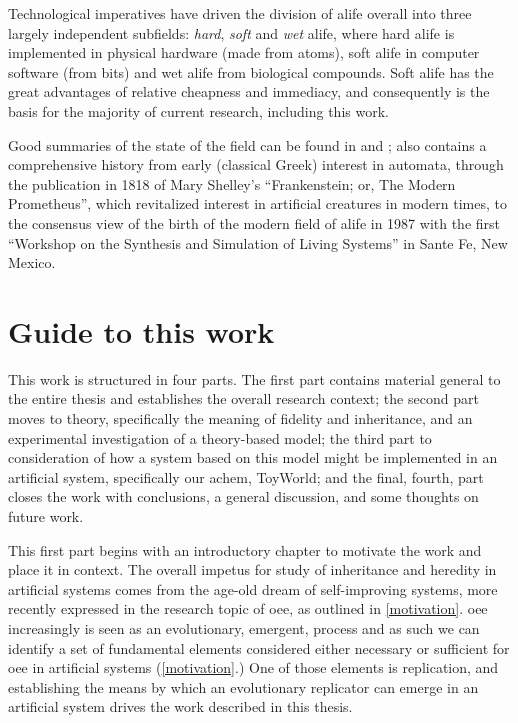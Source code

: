 Technological imperatives have driven the division of \gls{alife} overall into three largely independent subfields: \emph{hard}, \emph{soft} and \emph{wet} \gls{alife}, where hard \gls{alife} is implemented in physical hardware (made from atoms), soft \gls{alife} in computer software (from bits) and wet \gls{alife} from biological compounds. Soft \gls{alife} has the great advantages of relative cheapness and immediacy, and consequently is the basis for the majority of current research, including this work.

Good summaries of the state of the field can be found in \cite{Aicardi2010} and \cite{Aguilar2014}; \cite{Aguilar2014} also contains a comprehensive history from early (classical Greek) interest in automata, through the publication in 1818 of Mary Shelley's ``Frankenstein; or, The Modern Prometheus'', which revitalized interest in artificial creatures in modern times, to the consensus view of the birth of the modern field of \gls{alife} in 1987 with the first ``Workshop on the Synthesis and Simulation of Living Systems'' in Sante Fe, New Mexico.

\section{Guide to this work}

This work is structured in four parts. The first part contains material general to the entire thesis and establishes the overall research context; the second part moves to theory, specifically the meaning of fidelity and inheritance, and an experimental investigation of a theory-based model; the third part to consideration of how a system based on this model might be implemented in an artificial system, specifically our \gls{achem}, ToyWorld; and the final, fourth, part closes the work with conclusions, a general discussion, and some thoughts on future work.

This first part begins with an introductory chapter to motivate the work and place it in context. The overall impetus for study of inheritance and heredity in artificial systems comes from the age-old dream of self-improving systems, more recently expressed in the research topic of \gls{oee}, as outlined in \cref{motivation}. \Gls{oee} increasingly is seen as an evolutionary, emergent, process and as such we can identify a set of fundamental elements considered either necessary or sufficient for \gls{oee} in artificial systems (\cref{motivation}.) One of those elements is replication, and establishing the means by which an evolutionary replicator can emerge in an artificial system drives the work described in this thesis.

